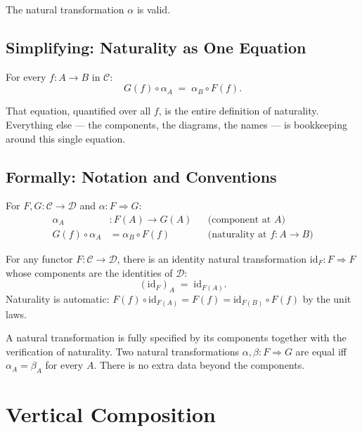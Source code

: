 The natural transformation $\alpha$ is valid.

\subsection{Simplifying: Naturality as One Equation}

For every $f : A \to B$ in $\mathcal{C}$:
\begin{equation*}
  G(f) \circ \alpha_A \;=\; \alpha_B \circ F(f).
\end{equation*}

That equation, quantified over all $f$, is the entire definition of
naturality. Everything else --- the components, the diagrams, the names ---
is bookkeeping around this single equation.

\subsection{Formally: Notation and Conventions}

For $F, G : \mathcal{C} \to \mathcal{D}$ and $\alpha : F \Rightarrow G$:
\begin{align*}
  \alpha_A &: F(A) \to G(A)
    && \text{(component at $A$)} \\
  G(f) \circ \alpha_A &= \alpha_B \circ F(f)
    && \text{(naturality at $f : A \to B$)}
\end{align*}

For any functor $F : \mathcal{C} \to \mathcal{D}$, there is an identity
natural transformation $\mathrm{id}_F : F \Rightarrow F$ whose components are
the identities of $\mathcal{D}$:
\begin{equation*}
  (\mathrm{id}_F)_A \;=\; \mathrm{id}_{F(A)}.
\end{equation*}
Naturality is automatic: $F(f) \circ \mathrm{id}_{F(A)} = F(f) =
\mathrm{id}_{F(B)} \circ F(f)$ by the unit laws.

A natural transformation is fully specified by its components together with
the verification of naturality. Two natural transformations $\alpha, \beta :
F \Rightarrow G$ are equal iff $\alpha_A = \beta_A$ for every $A$. There is
no extra data beyond the components.


\section{Vertical Composition}
\label{sec:vertical-comp}

